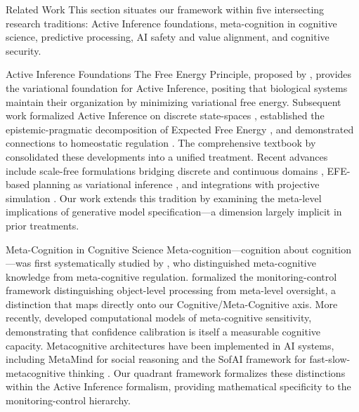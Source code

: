 \documentclass[
  ignorenonframetext,
]{beamer}
\author{\texorpdfstring{}{}}
\date{}
\begin{document}
\begin{frame}{Related Work}
\protect{}\label{sec:related_work}
This section situates our framework within five intersecting research
traditions: Active Inference foundations, meta-cognition in cognitive
science, predictive processing, AI safety and value alignment, and
cognitive security.

\begin{block}{Active Inference Foundations}
\protect{}\label{active-inference-foundations}
The Free Energy Principle, proposed by \cite{friston2010free}, provides
the variational foundation for Active Inference, positing that
biological systems maintain their organization by minimizing variational
free energy. Subsequent work formalized Active Inference on discrete
state-spaces \cite{dacosta2020active}, established the
epistemic-pragmatic decomposition of Expected Free Energy
\cite{friston2015active}, and demonstrated connections to homeostatic
regulation \cite{pezzulo2015active}. The comprehensive textbook by
\cite{parr2022active} consolidated these developments into a unified
treatment. Recent advances include scale-free formulations bridging
discrete and continuous domains \cite{friston2025scalefree}, EFE-based
planning as variational inference \cite{champion2025efeplanning}, and
integrations with projective simulation \cite{feps2025}. Our work
extends this tradition by examining the meta-level implications of
generative model specification---a dimension largely implicit in prior
treatments.
\end{block}

\begin{block}{Meta-Cognition in Cognitive Science}
\protect{}\label{meta-cognition-in-cognitive-science}
Meta-cognition---cognition about cognition---was first systematically
studied by \cite{flavell1979metacognition}, who distinguished
meta-cognitive knowledge from meta-cognitive regulation.
\cite{nelson1990metamemory} formalized the monitoring-control framework
distinguishing object-level processing from meta-level oversight, a
distinction that maps directly onto our Cognitive/Meta-Cognitive axis.
More recently, \cite{fleming2012metacognition} developed computational
models of meta-cognitive sensitivity, demonstrating that confidence
calibration is itself a measurable cognitive capacity. Metacognitive
architectures have been implemented in AI systems, including MetaMind
for social reasoning \cite{metamind2025} and the SofAI framework for
fast-slow-metacognitive thinking \cite{sofai2025}. Our quadrant
framework formalizes these distinctions within the Active Inference
formalism, providing mathematical specificity to the monitoring-control
hierarchy.
\end{block}


\end{frame}
\end{document}

